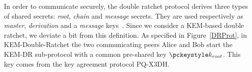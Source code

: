In order to communicate securely, the double ratchet protocol derives three types of shared secrets: \emph{root}, \emph{chain} and \emph{message} secrets. They are used respectively as \emph{master}, \emph{derivation} and a \emph{message} keys~\cite{double_ratchet}. Since we consider a KEM-based double ratchet, we deviate a bit from this definition.
As specified in Figure~\ref{DRProt}, in KEM-Double-Ratchet the two communicating peers Alice and Bob start the
KEM-DR sub-protocol with a common pre-shared key $\kroot$.
This key comes from the key agreement protocol PQ-X3DH.



